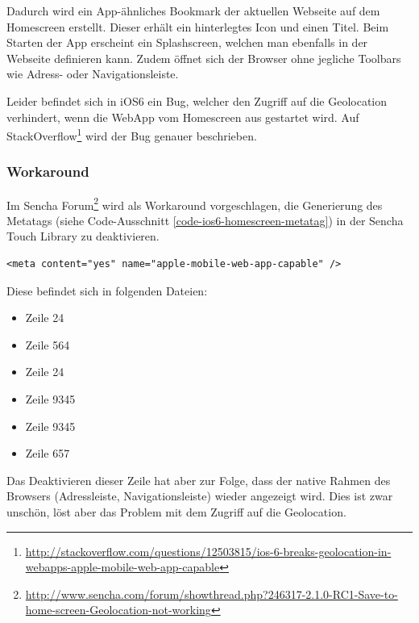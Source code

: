 Dadurch wird ein App-ähnliches Bookmark der aktuellen Webseite auf dem Homescreen erstellt.
Dieser erhält ein hinterlegtes Icon und einen Titel.
Beim Starten der App erscheint ein Splashscreen, welchen man ebenfalls in der Webseite definieren kann.
Zudem öffnet sich der Browser ohne jegliche Toolbars wie  Adress- oder Navigationsleiste.

Leider befindet sich in iOS6 ein Bug, welcher den Zugriff auf die Geolocation verhindert, wenn die \gls{WebApp} vom Homescreen aus gestartet wird.
Auf StackOverflow\footnote{\url{http://stackoverflow.com/questions/12503815/ios-6-breaks-geolocation-in-webapps-apple-mobile-web-app-capable}} wird der Bug genauer beschrieben.

\subsubsection{Workaround}
Im Sencha Forum\footnote{\url{http://www.sencha.com/forum/showthread.php?246317-2.1.0-RC1-Save-to-home-screen-Geolocation-not-working}} wird als Workaround vorgeschlagen, die Generierung des \newline {} Metatags (siehe Code-Ausschnitt \ref{code-ios6-homescreen-metatag}) in der Sencha Touch Library zu deaktivieren.

\lstset{language=HTML}
\begin{lstlisting}[caption=Metatag für iOS6 Workaround, label=code-ios6-homescreen-metatag]
<meta content="yes" name="apple-mobile-web-app-capable" />
\end{lstlisting}

Diese befindet sich in folgenden Dateien:

\begin{itemize}
\item {} Zeile 24
\item {} Zeile 564
\item {} Zeile 24
\item {} Zeile 9345
\item {} Zeile 9345
\item {} Zeile 657
\end{itemize}

Das Deaktivieren dieser Zeile hat aber zur Folge, dass der native Rahmen des Browsers (Adressleiste, Navigationsleiste) wieder angezeigt wird.
Dies ist zwar unschön, löst aber das Problem mit dem Zugriff auf die Geolocation.

